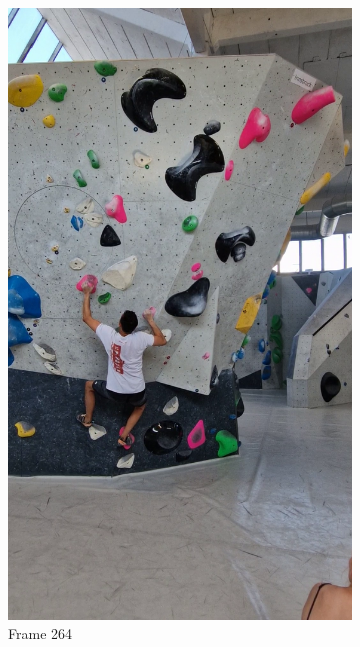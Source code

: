 \documentclass[./main.tex]{subfiles}
\begin{document}
\begin{figure}[htbp]
\begin{subfigure}{0.3\textwidth}
        \includegraphics[width=\textwidth]{entities/CA_264.png}
        \caption{Frame 264}
    \end{subfigure}
    \begin{subfigure}{0.3\textwidth}
        \centering

\end{subfigure}
\end{figure}
\end{document}
